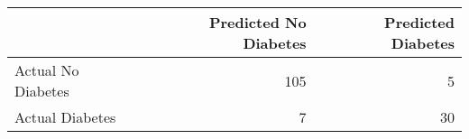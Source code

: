 \begin{tabular}{lrr}
\toprule
 & Predicted No Diabetes & Predicted Diabetes \\
\midrule
Actual No Diabetes & 105 & 5 \\
Actual Diabetes & 7 & 30 \\
\bottomrule
\end{tabular}
